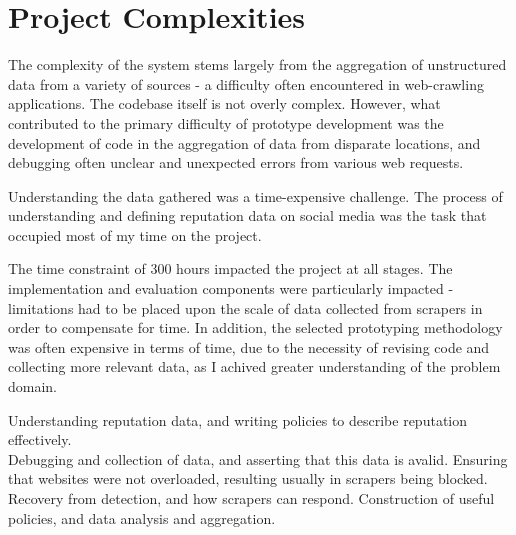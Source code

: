 \section{Project Complexities}

The complexity of the system stems largely from the aggregation of unstructured data from a variety of sources - a difficulty often encountered in web-crawling applications. The codebase itself is not overly complex. However, what contributed to the primary difficulty of prototype development was the development of code in the aggregation of data from disparate locations, and debugging often unclear and unexpected errors from various web requests. 

Understanding the data gathered was a time-expensive challenge. The process of understanding and defining reputation data on social media was the task that occupied most of my time on the project. 

The time constraint of 300 hours impacted the project at all stages. The implementation and evaluation components were particularly impacted - limitations had to be placed upon the scale of data collected from scrapers in order to compensate for time. In addition, the selected prototyping methodology was often expensive in terms of time, due to the necessity of revising code and collecting more relevant data, as I achived greater understanding of the problem domain. 


Understanding reputation data, and writing policies to describe reputation effectively.\\


Debugging and collection of data, and asserting that this data is avalid. Ensuring that websites were not overloaded, resulting usually in scrapers being blocked. Recovery from detection, and how scrapers can respond. Construction of useful policies, and data analysis and aggregation. 



